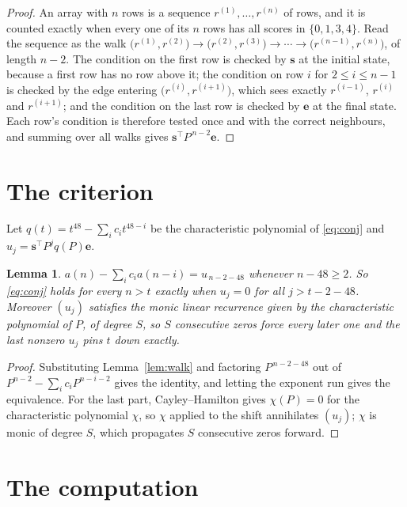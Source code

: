 \documentclass[11pt,a4paper]{article}
\theoremstyle{plain}
\newtheorem{lemma}[theorem]{Lemma}
\theoremstyle{definition}
\begin{document}
\begin{proof}
An array with $n$ rows is a sequence $r^{(1)},\dots,r^{(n)}$ of rows, and it is counted
exactly when every one of its $n$ rows has all scores in $\{0,1,3,4\}$. Read the sequence as the
walk $\bigl(r^{(1)},r^{(2)}\bigr)\to\bigl(r^{(2)},r^{(3)}\bigr)\to\cdots\to
\bigl(r^{(n-1)},r^{(n)}\bigr)$, of length $n-2$. The condition on the first row is
checked by $\mathbf{s}$ at the initial state, because a first row has no row above it; the
condition on row $i$ for $2\le i\le n-1$ is checked by the edge entering
$\bigl(r^{(i)},r^{(i+1)}\bigr)$, which sees exactly $r^{(i-1)}$, $r^{(i)}$ and
$r^{(i+1)}$; and the condition on the last row is checked by $\mathbf{e}$ at the final
state. Each row's condition is therefore tested once and with the correct neighbours, and
summing over all walks gives $\mathbf{s}^{\!\top}P^{\,n-2}\mathbf{e}$.
\end{proof}

\section{The criterion}

Let $q(t)=t^{48}-\sum_i c_i t^{48-i}$ be the characteristic polynomial of
\eqref{eq:conj} and $u_j=\mathbf{s}^{\!\top}P^{j}q(P)\mathbf{e}$.

\begin{lemma}\label{lem:crit}
$a(n)-\sum_i c_i a(n-i)=u_{\,n-2-48}$ whenever $n-48\ge2$. So \eqref{eq:conj}
holds for every $n>t$ exactly when $u_j=0$ for all $j>t-2-48$. Moreover $(u_j)$
satisfies the monic linear recurrence given by the characteristic polynomial of $P$, of
degree $S$, so $S$ consecutive zeros force every later one and the last nonzero $u_j$ pins
$t$ down exactly.
\end{lemma}

\begin{proof}
Substituting Lemma~\ref{lem:walk} and factoring $P^{\,n-2-48}$ out of
$P^{n-2}-\sum_i c_i P^{n-i-2}$ gives the identity, and letting the exponent run gives the
equivalence. For the last part, Cayley--Hamilton gives $\chi(P)=0$ for the characteristic
polynomial $\chi$, so $\chi$ applied to the shift annihilates $(u_j)$; $\chi$ is monic of
degree $S$, which propagates $S$ consecutive zeros forward.
\end{proof}

\section{The computation}
\end{document}
